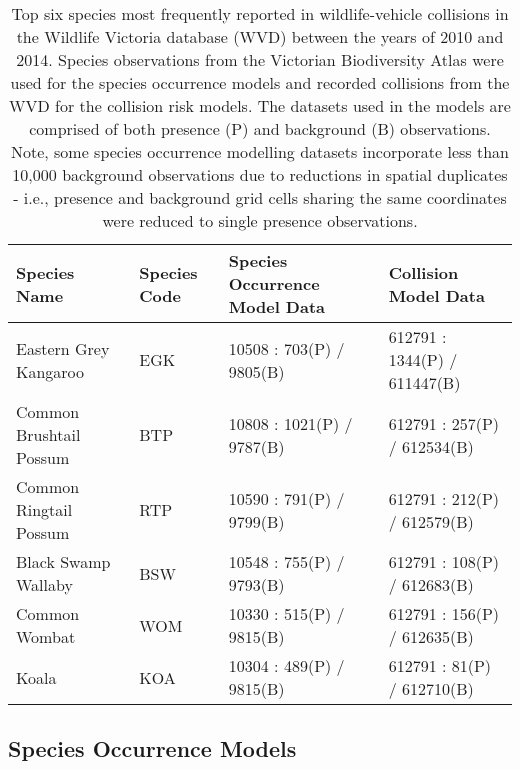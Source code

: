 \begin{table}[htp]
\caption[Six mammal species most frequently reported in wildlife-vehicle collisions]{Top six species most frequently reported in wildlife-vehicle collisions in the Wildlife Victoria database (WVD) between the years of 2010 and 2014. Species observations from the Victorian Biodiversity Atlas were used for the species occurrence models and recorded collisions from the WVD for the collision risk models. The datasets used in the models are comprised of both presence (P) and background (B) observations. Note, some species occurrence modelling datasets incorporate less than 10,000 background observations due to reductions in spatial duplicates - i.e., presence and background grid cells sharing the same coordinates were reduced to single presence observations.}
\centering
\begin{tabularx}{0.9\textwidth}{llll} \toprule
Species Name                     &Species Code     &Species Occurrence Model Data     &Collision Model Data \\ \midrule 
Eastern Grey Kangaroo 	& EGK	& 10508 : 703(P) / 9805(B) 	& 612791 : 1344(P) / 611447(B) \\ 
Common Brushtail Possum & BTP	& 10808 : 1021(P) / 9787(B)	& 612791 : 257(P) / 612534(B) \\ 
Common Ringtail Possum 	& RTP	& 10590 : 791(P) / 9799(B)	& 612791 : 212(P) / 612579(B) \\ 
Black Swamp Wallaby 	& BSW	& 10548 : 755(P) / 9793(B) 	& 612791 : 108(P) / 612683(B) \\ 
Common Wombat 			& WOM	& 10330 : 515(P) / 9815(B) 	& 612791 : 156(P) / 612635(B) \\ 
Koala 					& KOA 	& 10304 : 489(P) / 9815(B) 	& 612791 : 81(P) / 612710(B) \\ 
\bottomrule
\end{tabularx}
\label{6sp_species_data}
\end{table}

\subsection{Species Occurrence Models}

